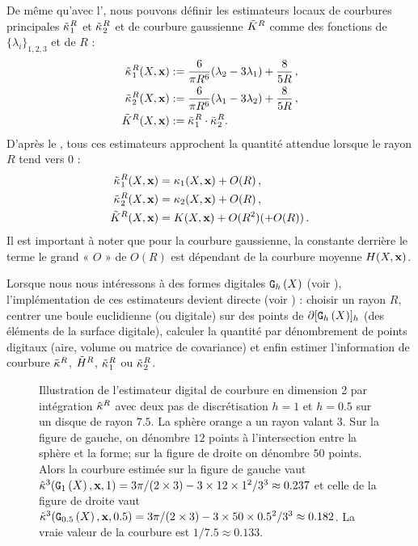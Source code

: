 %
De même qu'avec l', nous pouvons définir
les estimateurs locaux de courbures principales $\tilde{\kappa_{}}_{1}^{R}$ et
$\tilde{\kappa_{}}_{2}^{R}$ et de courbure gaussienne $\tilde{K}^{R}$ comme des
fonctions de $\{\lambda_i\}_{1,2,3}$ et de $R$ :
%
\begin{align}
  \label{eq:pottmann-3d-princ}
  \tilde{\kappa_{}}_{1}^{R}(X,\mathbf{x})& := \frac{6}{\pi R^6}(\lambda_2 - 3\lambda_1) + \frac{8}{5R}\,,\\
  \tilde{\kappa_{}}_{2}^{R}(X,\mathbf{x})& := \frac{6}{\pi R^6}(\lambda_1 - 3\lambda_2) + \frac{8}{5R}\,,\\
  \tilde{K}^{R}(X,\mathbf{x})& := \tilde{\kappa_{}}_{1}^{R} \cdot \tilde{\kappa_{}}_{2}^{R}.
\end{align}
%
D'après le , tous ces estimateurs approchent la
quantité attendue lorsque le rayon $R$ tend vers $0$ :
%
\begin{align}
  \label{eq:pottmann-3d-princ-conv}
  \tilde{\kappa_{}}_{1}^{R}(X,\mathbf{x})& = \kappa_{1}(X,\mathbf{x}) + O(R)\,,\\
  \tilde{\kappa_{}}_{2}^{R}(X,\mathbf{x})& = \kappa_{2}(X,\mathbf{x}) + O(R)\,,\\
  \tilde{K}^{R}(X,\mathbf{x})& = K(X,\mathbf{x}) + O(R^2) (+ O(R)) \,.
\end{align}
%
Il est important à noter que pour la courbure gaussienne, la constante derrière le terme
le grand « $O$ » de $O(R)$ est dépendant de la courbure moyenne
$H(X, \mathbf{x})$.

Lorsque nous nous intéressons à des formes digitales $\mathtt{G}_{h}\left(X\right)$ (voir
), l'implémentation de ces estimateurs devient
directe (voir ) : choisir un rayon $R$, centrer
une boule euclidienne (ou digitale) sur des points de $\partial \lbrack \mathtt{G}_{h}\left(X\right) \rbrack_{h}$
(\cad des éléments de la surface digitale), calculer la quantité par
dénombrement de points digitaux (aire, volume ou matrice de covariance) et enfin
estimer l'information de courbure $\tilde{\kappa}^{R}$, $\tilde{H}^{R}$,
$\tilde{\kappa_{}}_{1}^{R}$ ou $\tilde{\kappa_{}}_{2}^{R}$.

\begin{figure}[ht]
  \begin{center}
    
  \end{center}
  \caption[Illustration de l'estimateur digital de courbure en 2D par
  intégration $\CurvH{R}$.]{Illustration de l'estimateur digital de courbure en
  dimension 2 par intégration $\CurvH{R}$ avec deux pas de discrétisation $h =
  1$ et $h = 0.5$ sur un disque de rayon $7.5$. La sphère orange a un rayon
  valant $3$. Sur la figure de gauche, on dénombre $12$ points à l'intersection
  entre la sphère et la forme; sur la figure de droite on dénombre $50$ points.
  Alors la courbure estimée sur la figure de gauche vaut
  $\hat{\kappa}^{3}(\mathtt{G}_{1}\left(X\right), \mathbf{x}, 1) = 3\pi/(2\times3) -
  3\times12\times1^2/3^3 \approx 0.237$ et celle de la figure de droite vaut
  $\hat{\kappa}^{3}(\mathtt{G}_{0.5}\left(X\right), \mathbf{x}, 0.5) = 3\pi/(2\times3) -
  3\times50\times{0.5}^2/3^3 \approx 0.182$. La vraie valeur de la courbure est
  $1/7.5 \approx 0.133$.
  \label{fig:2d-curv-estimator}}
%
\end{figure}

